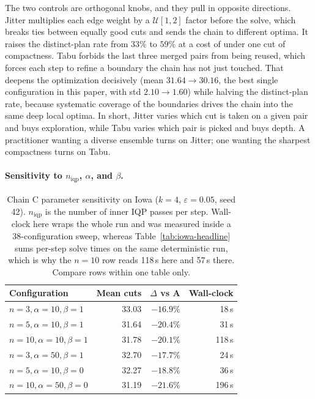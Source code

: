 \documentclass[11pt]{article}
\begin{document}
The two controls are orthogonal knobs, and they pull in opposite
directions. Jitter multiplies each edge weight by a
$\mathcal{U}[1,2]$ factor before the solve, which breaks ties between
equally good cuts and sends the chain to different optima. It raises
the distinct-plan rate from $33\%$ to $59\%$ at a cost of under one
cut of compactness. Tabu forbids the last three merged pairs from
being reused, which forces each step to refine a boundary the chain
has not just touched. That deepens the optimization decisively (mean
$31.64 \to 30.16$, the best single configuration in this paper, with
std $2.10 \to 1.60$) while halving the distinct-plan rate, because
systematic coverage of the boundaries drives the chain into the same
deep local optima. In short, Jitter varies which cut is taken on a
given pair and buys exploration, while Tabu varies which pair is
picked and buys depth. A practitioner wanting a diverse ensemble
turns on Jitter; one wanting the sharpest compactness turns on Tabu.

\paragraph{Sensitivity to $n_{\mathrm{iqp}}$, $\alpha$, and $\beta$.}\label{sec:exp-sensitivity}

\begin{table}[H]
\centering
\small
\begin{tabular}{lrrr}
\toprule
Configuration & Mean cuts & $\Delta$ vs A & Wall-clock \\
\midrule
$n = 3, \alpha = 10, \beta = 1$  & 33.03 & $-16.9\%$ & 18\,s \\
$n = 5, \alpha = 10, \beta = 1$  & 31.64 & $-20.4\%$ & 31\,s \\
$n = 10, \alpha = 10, \beta = 1$ & 31.78 & $-20.1\%$ & 118\,s \\
$n = 3, \alpha = 50, \beta = 1$  & 32.70 & $-17.7\%$ & 24\,s \\
$n = 5, \alpha = 10, \beta = 0$  & 32.27 & $-18.8\%$ & 36\,s \\
$n = 10, \alpha = 50, \beta = 0$ & 31.19 & $-21.6\%$ & 196\,s \\
\bottomrule
\end{tabular}
\caption{Chain C parameter sensitivity on Iowa ($k = 4$,
  $\varepsilon = 0.05$, seed 42). $n_{\mathrm{iqp}}$ is the number of
  inner IQP passes per step. Wall-clock here wraps the whole run and
  was measured inside a 38-configuration sweep, whereas
  Table~\ref{tab:iowa-headline} sums per-step solve times on the same
  deterministic run, which is why the $n = 10$ row reads 118\,s here
  and 57\,s there. Compare rows within one table only.}\label{tab:sensitivity}
\end{table}
\end{document}
